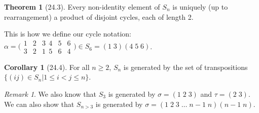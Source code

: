 \documentclass{article}
\theoremstyle{definition}
\newtheorem*{cor}{Corollary}
\newtheorem*{thm}{Theorem}
\theoremstyle{remark}
\newtheorem*{rmk}{Remark}
\begin{document}
{{            \begin{thm}[24.3]
                Every non-identity element of $S_n$ is uniquely (up to rearrangement) a product of disjoint cycles, each of length 2.
            \end{thm}
            
            \noindent This is how we define our cycle notation: $\alpha=\big(\begin{smallmatrix} 1&2&3 \ \ 4&5&6 \\ 3&2&1 \ \ 5&6&4\end{smallmatrix}\big) \in S_6=(1\;3)(4\;5\;6)$.
            
            \begin{cor}[24.4]
                For all $n\geq2$, $S_n$ is generated by the set of transpositions $\{(ij)\in S_n|1\leq i<j\leq n\}$.
            \end{cor}
            
            \begin{rmk}
                We also know that $S_3$ is generated by $\sigma=(1\;2\;3)$ and $\tau=(2\;3)$. We can also show that $S_{n>3}$ is generated by $\sigma=(1\;2\;3\;\ldots\;n-1\;n)(n-1\;n)$.
            \end{rmk}
        }
    }
\end{document}
